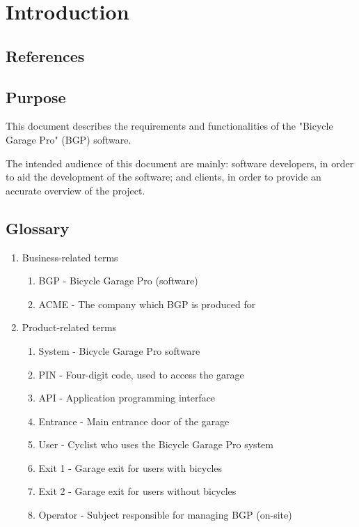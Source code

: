 \documentclass[12pt,titlepage]{article}
\begin{document}


\maketitle
\newpage
\tableofcontents
\thispagestyle{empty}
\setcounter{page}{0}
\newpage

\section{Introduction}
\subsection{References}
\subsection{Purpose}
This document describes the requirements and functionalities of the "Bicycle Garage Pro" (BGP) software.

The intended audience of this document are mainly: software developers, in order to aid the development of the software; and clients, in order to provide an accurate overview of the project.

\subsection{Glossary}
\begin{enumerate}
	\item Business-related terms
	\begin{enumerate}
		\item BGP - Bicycle Garage Pro (software)
		\item ACME - The company which BGP is produced for
	\end{enumerate}

	\item Product-related terms
	\begin{enumerate}
	\item System - Bicycle Garage Pro software
	\item PIN - Four-digit code, used to access the garage
	\item API - Application programming interface
	\item Entrance - Main entrance door of the garage
	\item User - Cyclist who uses the Bicycle Garage Pro system
	\item Exit 1 - Garage exit for users with bicycles
	\item Exit 2 - Garage exit for users without bicycles
	\item Operator - Subject responsible for managing BGP (on-site)
	\end{enumerate}
\end{enumerate}
\end{document}
